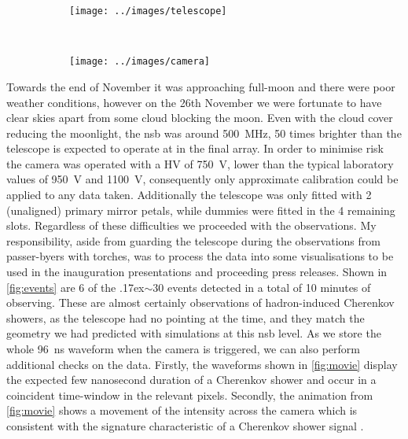 \documentclass[%
amsmath,amssymb,
onecolumn,
a4paper,
10pt
]{article}%
\newcommand{\utilde}{\raise.17ex\hbox{$\scriptstyle\mathtt{\sim}$}}
\begin{document}
	\begin{figure}[h]
		\captionsetup{type=figure}
		\caption{\label{fig:telescope} The \gls{chec-m} camera mounted onto the GATE telescope structure at the Observatoire de Paris-Meudon.}
		\begin{subfigure}[b]{0.49\textwidth}
			\texttt{[image: ../images/telescope]}
		\end{subfigure}
		~
		\begin{subfigure}[b]{0.49\textwidth}
			\texttt{[image: ../images/camera]}
		\end{subfigure}
	\end{figure}
	
	Towards the end of November it was approaching full-moon and there were poor weather conditions, however on the 26th November we were fortunate to have clear skies apart from some cloud blocking the moon. Even with the cloud cover reducing the moonlight, the \gls{nsb} was around 500~MHz, 50 times brighter than the telescope is expected to operate at in the final array. In order to minimise risk the camera was operated with a HV of 750~V, lower than the typical laboratory values of 950~V and 1100~V, consequently only approximate calibration could be applied to any data taken. Additionally the telescope was only fitted with 2 (unaligned) primary mirror petals, while dummies were fitted in the 4 remaining slots. Regardless of these difficulties we proceeded with the observations. My responsibility, aside from guarding the telescope during the observations from passer-byers with torches, was to process the data into some visualisations to be used in the inauguration presentations and proceeding press releases. Shown in \autoref{fig:events} are 6 of the \utilde30 events detected in a total of 10 minutes of observing. These are almost certainly observations of hadron-induced Cherenkov showers, as the telescope had no pointing at the time, and they match the geometry we had predicted with simulations at this \gls{nsb} level. As we store the whole 96~ns waveform when the camera is triggered, we can also perform additional checks on the data. Firstly, the waveforms shown in \autoref{fig:movie} display the expected few nanosecond duration of a Cherenkov shower and occur in a coincident time-window in the relevant pixels. Secondly, the animation from \autoref{fig:movie} shows a movement of the intensity across the camera which is consistent with the signature characteristic of a Cherenkov shower signal \cite{Dournaux2016}.
	
\end{document}
